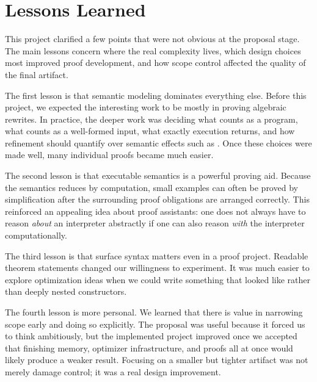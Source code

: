 \section{Lessons Learned}
\label{sec:lessons}

This project clarified a few points that were not obvious at the proposal
stage. The main lessons concern where the real complexity lives, which design
choices most improved proof development, and how scope control affected the
quality of the final artifact.

The first lesson is that semantic modeling dominates everything else. Before
this project, we expected the interesting work to be mostly in proving algebraic
rewrites. In practice, the deeper work was deciding what counts as a program,
what counts as a well-formed input, what exactly execution returns, and how
refinement should quantify over semantic effects such as \vundef. Once these
choices were made well, many individual proofs became much easier.

The second lesson is that executable semantics is a powerful proving aid.
Because the semantics reduces by computation, small examples can often be
proved by simplification after the surrounding proof obligations are arranged
correctly. This reinforced an appealing idea about proof assistants: one does
not always have to reason \emph{about} an interpreter abstractly if one can
also reason \emph{with} the interpreter computationally.

The third lesson is that surface syntax matters even in a proof project.
Readable theorem statements changed our willingness to experiment. It was much
easier to explore optimization ideas when we could write something that looked
like \llvm rather than deeply nested constructors.

The fourth lesson is more personal. We learned that there is value in
narrowing scope early and doing so explicitly. The proposal was useful because
it forced us to think ambitiously, but the implemented project improved once we
accepted that finishing memory, optimizer infrastructure, and proofs all at
once would likely produce a weaker result. Focusing on a smaller but tighter
artifact was not merely damage control; it was a real design improvement.
